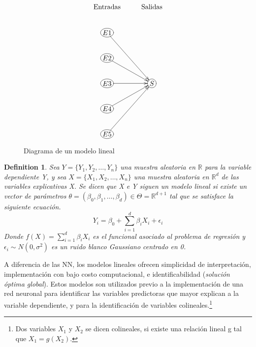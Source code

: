 \documentclass[nojss]{jss}
\newtheorem{Def}{Definition}
\begin{document}
\begin{figure}[H]
 \centering
 $$
 \xymatrix{
  \text{Entradas}     &\text{Salidas}\\
  *+[o][F]{E1}\ar[ddr]& \\
  *+[o][F]{E2}\ar[dr] & \\
  *+[o][F]{E3}\ar[r]  & *+[o][F]{S}\\
  *+[o][F]{E4}\ar[ur] & \\	
  *+[o][F]{E5}\ar[uur]& \\		
 }
 $$
 \caption[Modelo lineal]{Diagrama de un modelo lineal}
 \label{fig:fig2}
\end{figure}
 
\begin{Def}
	Sea $Y = \{Y_1,Y_2,\ldots,Y_n\}$ una muestra aleatoria en $\mathbb{R}$ para la variable dependiente Y, y sea $X = \{X_1,X_2,\ldots,X_n\}$ una muestra aleatoria en $\mathbb{R}^d$ de las variables explicativas X. Se dicen que X e Y siguen un modelo lineal si existe un vector de parámetros $\theta = (\beta_0,\beta_1, \ldots,\beta_d) \in\Theta = \mathbb{R}^{d+1}$ tal que se satisface la siguiente ecuación.
	$$Y_i = \beta_0 + \sum_{i=1}^d \beta_i X_i +\epsilon_i$$
	Donde $f(X) = \sum_{i=1}^d\beta_iX_i$ es el funcional asociado al problema de regresión y $\epsilon_i \sim N(0,\sigma^2)$ es un ruido blanco Gaussiano centrado en 0.
\end{Def}
 
 
A diferencia de las NN, los modelos lineales ofrecen simplicidad de interpretación, implementación con bajo costo computacional, e identificabilidad (\textit{solución óptima global}). Estos modelos son utilizados previo a la implementación de una red neuronal para identificar las variables predictoras que mayor explican a la variable dependiente, y para la identificación de variables colineales.\footnote{Dos variables $X_1$ y $X_2$ se dicen colineales, si existe una relación lineal g tal que $X_1 = g(X_2)$.}
\end{document}
